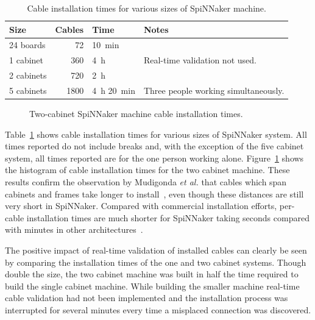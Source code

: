 			\begin{table}
				\center
				\begin{tabular}{lrll}
					\toprule
						Size & Cables & Time & Notes \\
					\midrule
						24 boards  & \num{72}   & \SI{10}{\minute} & \\
						1 cabinet  & \num{360}  & \SI{4}{\hour} &
							Real-time validation not used. \\
						2 cabinets & \num{720}  & \SI{2}{\hour} & \\
						5 cabinets & \num{1800} & \SI{4}{\hour} \SI{20}{\minute} &
							Three people working simultaneously. \\
					\bottomrule
				\end{tabular}
				
				\caption[Cable installation times for various SpiNNaker machines.]%
				{Cable installation times for various sizes of SpiNNaker
				machine.}
				\label{tab:install-time}
			\end{table}
			
			\begin{figure}
				
				\caption{Two-cabinet SpiNNaker machine cable installation times.}
				\label{fig:install-histogram}
			\end{figure}
			
			Table~\ref{tab:install-time} shows cable installation times for various
			sizes of SpiNNaker system. All times reported do not include breaks and,
			with the exception of the five cabinet system, all times reported are for
			the one person working alone.  Figure~\ref{fig:install-histogram} shows
			the histogram of cable installation times for the two cabinet machine.
			These results confirm the observation by Mudigonda \emph{et al.} that
			cables which span cabinets and frames take longer to
			install~\cite{mudigonda11}, even though these distances are still very
			short in SpiNNaker. Compared with commercial installation efforts,
			per-cable installation times are much shorter for SpiNNaker taking
			seconds compared with minutes in other architectures~\cite{mudigonda11}.
			
			The positive impact of real-time validation of installed cables can
			clearly be seen by comparing the installation times of the one and two
			cabinet systems. Though double the size, the two cabinet machine was
			built in half the time required to build the single cabinet machine.
			While building the smaller machine real-time cable validation had not been
			implemented and the installation process was interrupted for several
			minutes every time a misplaced connection was discovered.
			
